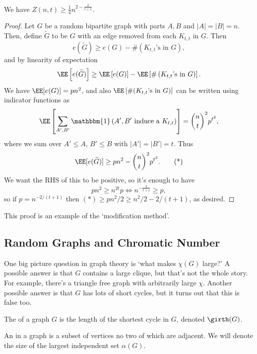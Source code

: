 \begin{theorem}
	We have $Z(n, t) \geq \frac{1}{4}n^{2 - \frac{2}{t + 1}}$.
\end{theorem}
\begin{proof}
	Let $G$ be a random bipartite graph with parts $A, B$ and $|A| = |B| = n$.
	Then, define $\widetilde{G}$ to be $G$ with an edge removed from each $K_{t, t}$ in $G$.
	Then
	$$
	e(\widetilde{G}) \geq e(G) - \#\left(K_{t, t}\text{'s in $G$}\right),
	$$
	and by linearity of expectation
	$$
	\EE \left[e(\widetilde{G})\right] \geq \EE\left[e(G)\right] - \EE\left[\#\left(K_{t, t}\text{'s in $G$}\right)\right].
	$$
	We have $\EE[e(G)] = pn^2$, and also $\EE\left[\#(K_{t,t}\text{'s in $G$})\right]$ can be written using indicator functions as 
$$
	\EE\left[\sum_{A', B'} \mathbbm{1}\left(A', B' \text{ induce a $K_{t, t}$}\right)\right] = \binom{n}{t}^2 p^{t^2},
$$
where we sum over $A' \leq A$, $B' \leq B$ with $|A'| = |B'| = t$. Thus
\begin{equation}\label{eq:zar}
	\EE[e(\widetilde{G})] \geq pn^2 - \binom{n}{t}^2p^{t^2}.\tag{*}
\end{equation}
We want the RHS of this to be positive, so it's enough to have
$$
pn^2 \geq n^{2t}p \iff n^{-\frac{2}{t + 1}} \geq p,
$$
so if $p = n^{-2/(t + 1)}$ then $(*) \geq pn^2/2 \geq n^2/2 - 2/(t+1)$, as desired.
\end{proof}

This proof is an example of the `modification method'.

\subsection{Random Graphs and Chromatic Number}


One big picture question in graph theory is `what makes $\chi(G)$ large?'
A possible answer is that $G$ contains a large clique, but that's not the whole story. For example, there's a triangle free graph with arbitrarily large $\chi$. Another possible answer is that $G$ has lots of short cycles, but it turns out that this is false too.

\begin{definition}[Girth]
	The  of a graph $G$ is the length of the shortest cycle in $G$, denoted $\girth(G)$.
\end{definition}

\begin{definition}
	An  in a graph is a subset of vertices no two of which are adjacent. We will denote the size of the largest independent set $\alpha(G)$.
\end{definition}

